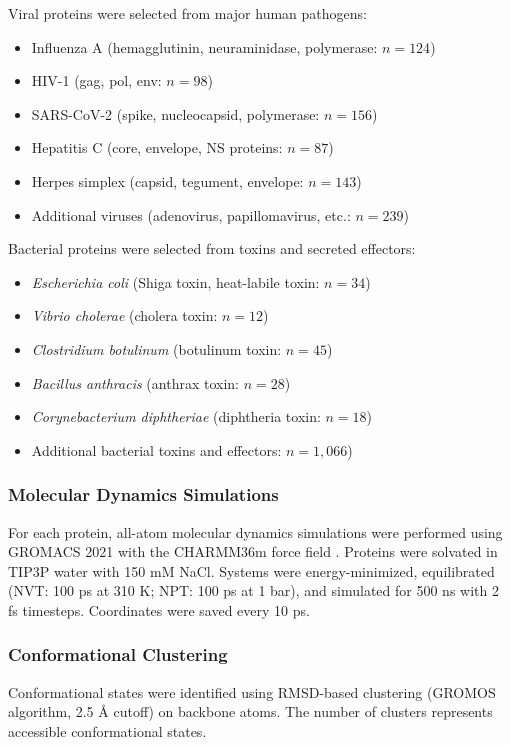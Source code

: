 \documentclass[11pt]{article}
\begin{document}
Viral proteins were selected from major human pathogens:
\begin{itemize}
\item Influenza A (hemagglutinin, neuraminidase, polymerase: $n=124$)
\item HIV-1 (gag, pol, env: $n=98$)
\item SARS-CoV-2 (spike, nucleocapsid, polymerase: $n=156$)
\item Hepatitis C (core, envelope, NS proteins: $n=87$)
\item Herpes simplex (capsid, tegument, envelope: $n=143$)
\item Additional viruses (adenovirus, papillomavirus, etc.: $n=239$)
\end{itemize}

Bacterial proteins were selected from toxins and secreted effectors:
\begin{itemize}
\item \textit{Escherichia coli} (Shiga toxin, heat-labile toxin: $n=34$)
\item \textit{Vibrio cholerae} (cholera toxin: $n=12$)
\item \textit{Clostridium botulinum} (botulinum toxin: $n=45$)
\item \textit{Bacillus anthracis} (anthrax toxin: $n=28$)
\item \textit{Corynebacterium diphtheriae} (diphtheria toxin: $n=18$)
\item Additional bacterial toxins and effectors: $n=1,066$)
\end{itemize}

\subsubsection{Molecular Dynamics Simulations}

For each protein, all-atom molecular dynamics simulations were performed using GROMACS 2021 \citep{Abraham2015} with the CHARMM36m force field \citep{Huang2017}. Proteins were solvated in TIP3P water with 150 mM NaCl. Systems were energy-minimized, equilibrated (NVT: 100 ps at 310 K; NPT: 100 ps at 1 bar), and simulated for 500 ns with 2 fs timesteps. Coordinates were saved every 10 ps.

\subsubsection{Conformational Clustering}

Conformational states were identified using RMSD-based clustering (GROMOS algorithm, 2.5 Å cutoff) on backbone atoms. The number of clusters represents accessible conformational states.
\end{document}
